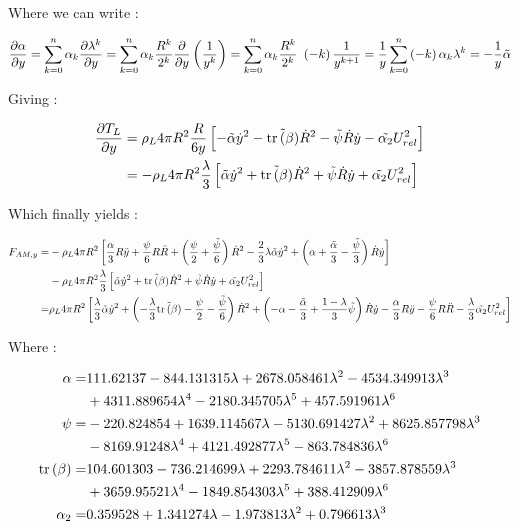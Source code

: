 Where we can write :

\begin{align}
\frac{\partial \alpha}{\partial y}=\sum_{k=0}^{n}\alpha_{k}\frac{\partial \lambda^{k}}{\partial y} = \sum_{k=0}^{n}\alpha_{k}\frac{R^{k}}{2^{k}}\frac{\partial }{\partial y}\left( \frac{1}{y^{k}} \right)=\sum_{k=0}^{n}\alpha_{k}\frac{R^{k}}{2^{k}}~\left( -k \right)\frac{1}{y^{k+1}}=\frac{1}{y}\sum_{k=0}^{n}\left( -k \right)\alpha_{k}\lambda^{k}=-\frac{1}{y}\tilde{\alpha}
\end{align} 

Giving : 

\begin{align}
\frac{\partial T_{L}}{\partial y}&=\rho_{L}4\pi R^{2}\frac{R}{6y}\left[ -\tilde{\alpha}\dot{y}^{2}-\tilde{\mathrm{tr}\left( \beta \right)}\dot{R}^{2}-\tilde{\psi}\dot{R}\dot{y}-\tilde{\alpha_{2}}U_{rel}^{2} \right]\\
&=-\rho_{L}4\pi R^{2}\frac{\lambda}{3}\left[ \tilde{\alpha}\dot{y}^{2}+\tilde{\mathrm{tr}\left( \beta \right)}\dot{R}^{2}+\tilde{\psi}\dot{R}\dot{y}+\tilde{\alpha_{2}}U_{rel}^{2} \right]
\end{align}

Which finally yields : 

\begin{align}
\nonumber F_{AM,y}=&-\rho_{L}4\pi R^{2}\left[ \frac{\alpha}{3}R\ddot{y}+\frac{\psi}{6}R \ddot{R} + \left( \frac{\psi}{2} +\frac{\tilde{\psi}}{6} \right)\dot{R}^{2} -\frac{2}{3}\lambda \tilde{\alpha} \dot{y}^{2} + \left(  \alpha + \frac{\tilde{\alpha}}{3} - \frac{\tilde{\psi}}{3}  \right)\dot{R}\dot{y}  \right] \\
&-\rho_{L}4\pi R^{2}\frac{\lambda}{3}\left[ \tilde{\alpha}\dot{y}^{2}+\tilde{\mathrm{tr}\left( \beta \right)}\dot{R}^{2}+\tilde{\psi}\dot{R}\dot{y}+\tilde{\alpha_{2}}U_{rel}^{2} \right]\\
=&\rho_{L}4\pi R^{2}\left[ \frac{\lambda}{3}\tilde{\alpha}\dot{y}^{2}+\left( -\frac{\lambda}{3}\tilde{\mathrm{tr}\left( \beta \right)}-\frac{\psi}{2}-\frac{\tilde{\psi}}{6} \right)\dot{R}^2+\left( -\alpha - \frac{\tilde{\alpha}}{3}+\frac{1-\lambda}{3}\tilde{\psi} \right)\dot{R} \dot{y} - \frac{\alpha}{3}R\ddot{y} - \frac{\psi}{6}R \ddot{R}-\frac{\lambda}{3}\tilde{\alpha_{2}}U_{rel}^{2}  \right]  
\end{align}

Where :

\begin{align}
\nonumber \alpha = &111.62137 - 844.131315 \lambda + 2678.058461 \lambda^{2} - 4534.349913 \lambda^{3} \\ &+ 4311.889654 \lambda^{4} - 2180.345705 \lambda^{5} + 457.591961 \lambda^{6}\\
\nonumber \psi = &-220.824854 + 1639.114567 \lambda - 5130.691427 \lambda^{2} + 8625.857798 \lambda^{3} \\ &- 8169.91248 \lambda^{4} + 4121.492877 \lambda^{5} - 863.784836 \lambda^{6}\\
\nonumber \mathrm{tr}\left( \beta \right) = &104.601303 - 736.214699 \lambda + 2293.784611 \lambda^{2} - 3857.878559 \lambda^{3} \\ &+ 3659.95521 \lambda^{4} - 1849.854303 \lambda^{5} + 388.412909 \lambda^{6}\\
\alpha_{2}= &0.359528 + 1.341274 \lambda - 1.973813 \lambda^{2} + 0.796613 \lambda^{3}
\end{align}


